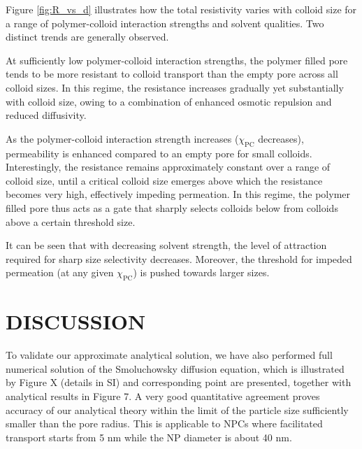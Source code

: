 \documentclass[12pt, a4paper]{article}
\begin{document}
Figure \ref{fig:R_vs_d} illustrates how the total resistivity varies with colloid size for a range of polymer-colloid interaction strengths and solvent qualities. 
Two distinct trends are generally observed.

At sufficiently low polymer-colloid interaction strengths, the polymer filled pore tends to be more resistant to colloid transport than the empty pore across  all colloid sizes. 
In this regime, the resistance increases gradually yet substantially with colloid size, owing to a combination of enhanced osmotic repulsion and reduced diffusivity.

As the polymer-colloid interaction strength increases ($\chi_{\text{PC}}$ decreases), permeability is enhanced compared to an empty pore for small colloids. 
Interestingly, the resistance remains approximately constant over a range of colloid size, until a critical colloid size emerges above which the resistance becomes very high, 
effectively impeding permeation. 
In this regime, the polymer filled pore thus acts as a gate that sharply selects colloids below from colloids above a certain threshold size.

It can be seen that with decreasing solvent strength, the level of attraction required for sharp size selectivity decreases. 
Moreover, the threshold for impeded permeation (at any given $\chi_{\text{PC}}$) is pushed towards larger sizes.


\section{DISCUSSION}


To validate our approximate analytical solution, we have also performed full numerical solution of the Smoluchowsky diffusion equation, which is illustrated by Figure X 
(details in SI) and corresponding point are presented, together with analytical results in Figure 7. A very good quantitative agreement proves accuracy of our analytical theory
within the limit of the particle size sufficiently smaller than the pore radius. This is applicable to NPCs where facilitated transport starts from 5 nm while the
NP diameter is about 40 nm.
\end{document}
